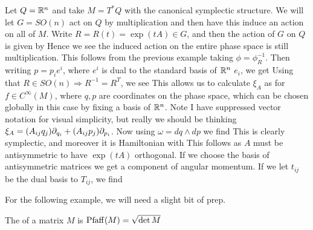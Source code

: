 \documentclass{article}
\begin{document}
\begin{example}
Let $Q = \mathbb{R}^n$ and take $M= T^\ast Q$ with the canonical symplectic structure. We will let $G= SO(n)$ act on $Q$ by multiplication and then have this induce an action on all of $M$. Write $R = R(t) = \exp(tA) \in G$, and then the action of $G$ on $Q$ is given by 
 Hence we see the induced action on the entire phase space is still multiplication. This follows from the previous example taking $\phi = \phi_R^{-1}$. Then writing $p = p_i e^i$, where $e^i$ is dual to the standard basis of $\mathbb{R}^n$ $e_i$, we get 
 Using that $R \in SO(n) \Rightarrow R^{-1} = R^T$, we see 
This allows us to calculate $\xi_A$ as for $f \in C^\infty(M)$,
where $q,p$ are coordinates on the phase space, which can be chosen globally in this case by fixing a basis of $\mathbb{R}^n$. Note I have suppressed vector notation for visual simplicity, but really we should be thinking $\xi_A = (A_{ij}q_j) \partial_{q_i} + (A_{ij}p_j)\partial_{p_i}$. Now using $\omega = dq \wedge dp$ we find 
This is clearly symplectic, and moreover it is Hamiltonian with 
This follows as $A$ must be antisymmetric to have $\exp(tA)$ orthogonal. If we choose the basis 
of antisymmetric matrices we get 
a component of angular momentum. If we let $t_{ij}$ be the dual basis to $T_{ij}$, we find 
\end{example}


For the following example, we will need a slight bit of prep. 

\begin{definition}
The  of a matrix $M$ is $\operatorname{Pfaff}(M) = \sqrt{\det M}$
\end{definition}
\end{document}
